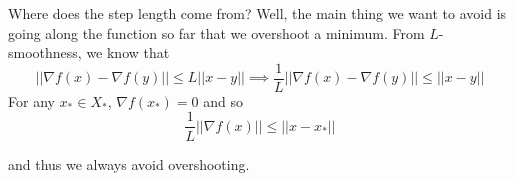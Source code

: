 \begin{remark}
    Where does the step length come from? Well, the main thing we want to avoid is going along the function so far that we overshoot a minimum. From $L$-smoothness, we know that
    $$||\nabla f(x) - \nabla f(y) || \leq L||x-y|| \implies \frac{1}{L}||\nabla f(x) - \nabla f(y) || \leq ||x-y||$$
    For any $x_* \in X_*$, $\nabla f(x_*) = 0$ and so 
    $$\frac{1}{L}||\nabla f(x)|| \leq ||x - x_*||$$

    and thus we always avoid overshooting. 
\end{remark}

\
